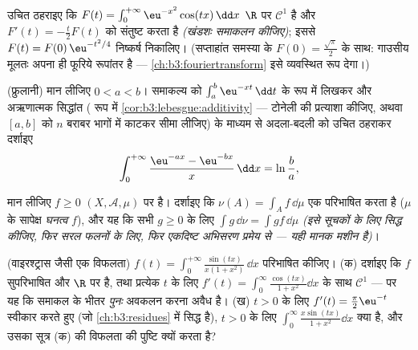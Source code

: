 \begin{exercise}[$\star\star$]\label{exo:b3:lebesgue:7}
उचित ठहराइए कि $F(t) = \int_0^{+\infty}\eu^{-x^2}\cos(tx)\,\dd x$ $\R$ पर $\mathcal C^1$ है और $F'(t) = -\frac t2F(t)$ को संतुष्ट करता
है \emph{(खंडशः समाकलन कीजिए)}; इससे $F(t) =
F(0)\,\eu^{-t^2/4}$ निष्कर्ष निकालिए।
(सप्ताहांत समस्या के $F(0) = \frac{\sqrt\pi}2$ के साथ: गाउसीय मूलतः अपना ही फूरिये
रूपांतर है --- \cref{ch:b3:fouriertransform} इसे व्यवस्थित रूप देगा।)
\end{exercise}

\begin{exercise}[$\star\star\star$]\label{exo:b3:lebesgue:8}
(फ्रुलानी) मान लीजिए $0 < a < b$। समाकल्य को $\int_a^b \eu^{-xt}\,\dd t$ के रूप में लिखकर और
अऋणात्मक सिद्धांत ( रूप में \cref{cor:b3:lebesgue:additivity} --- टोनेली की प्रत्याशा
कीजिए, अथवा $[a,b]$ को $n$ बराबर भागों में काटकर सीमा लीजिए) के
माध्यम से अदला-बदली को उचित ठहराकर दर्शाइए
\[
\int_0^{+\infty}\frac{\eu^{-ax} - \eu^{-bx}}{x}\,\dd x =
\ln\frac ba,
\]
\end{exercise}

\begin{exercise}[$\star\star$]\label{exo:b3:lebesgue:9}
मान लीजिए $f \geq 0$ $(X, \mathcal A, \mu)$ पर  है। दर्शाइए कि $\nu(A) = \int_A f\,\dd\mu$ एक 
परिभाषित करता है ($\mu$ के सापेक्ष \emph{घनत्व} $f$), और यह कि सभी  $g \geq 0$ के लिए $\int g\,\dd\nu = \int gf\,\dd\mu$ \emph{(इसे
सूचकों के लिए सिद्ध कीजिए, फिर सरल फलनों के लिए, फिर एकदिष्ट
अभिसरण प्रमेय से --- यही मानक मशीन है)}।
\end{exercise}

\begin{exercise}[$\star\star\star$]\label{exo:b3:lebesgue:10}
(वाइरश्ट्रास जैसी एक विफलता) $f(t) =
\int_0^{+\infty}\frac{\sin(tx)}{x(1 + x^2)}\,\dd x$ परिभाषित कीजिए।
(क) दर्शाइए कि $f$ सुपरिभाषित और $\R$ पर  है, तथा प्रत्येक
$t$ के लिए $f'(t) = \int_0^\infty\frac{\cos(tx)}{1 +
x^2}\dd x$ के साथ $\mathcal C^1$ --- पर यह कि समाकल के भीतर
\emph{पुनः} अवकलन करना अवैध है।
(ख) $t > 0$ के लिए $f'(t) = \frac\pi2\eu^{-t}$ स्वीकार करते हुए (जो \cref{ch:b3:residues} में सिद्ध है),
$t > 0$ के लिए $\int_0^\infty\frac{x\sin(tx)}{1+x^2}\dd x$ क्या है, और उसका सूत्र (क) की विफलता की पुष्टि
क्यों करता है?
\end{exercise}

